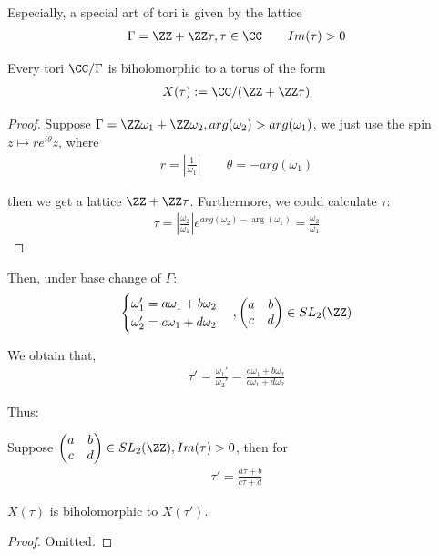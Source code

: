 \documentclass[Total.tex]{subfiles}
\begin{document}
			Especially, a special art of tori is given by the lattice
			\begin{gather*}
				\Gamma=\ZZ+\ZZ\tau,\tau\in \CC\qquad Im(\tau)>0
			\end{gather*}
			
			\begin{lemma}
				Every tori $\CC/\Gamma$ is biholomorphic to a torus of the form
				\begin{gather*}
					X(\tau):=\CC/(\ZZ+\ZZ\tau)
				\end{gather*}
			\end{lemma}
			\begin{proof}
				Suppose $\Gamma=\ZZ\omega_1+\ZZ \omega_2,arg(\omega_2)>arg(\omega_1)$, we just use the spin $z\mapsto re^{i\theta}z$, where
				\begin{gather*}
					r= |\frac{1}{\omega_1}| \qquad \theta=-arg(\omega_1)
				\end{gather*}
				
				then we get a lattice $\ZZ+\ZZ\tau$.  Furthermore, we could calculate $\tau$:
				\begin{gather*}
					\tau= |\frac{\omega_2}{\omega_1}|e^{arg(\omega_2)-\arg(\omega_1)}=\frac{\omega_2}{\omega_1}
				\end{gather*}
			\end{proof}
			
			Then, under base change of $\Gamma$:
			\begin{gather*}\begin{cases}
					\omega_1'=a\omega_1+b\omega_2\\
					\omega_2'=c\omega_1+d\omega_2
				\end{cases},\begin{pmatrix}
					a&b\\
					c&d
				\end{pmatrix}\in SL_2(\ZZ)
			\end{gather*}
			
			We obtain that,
			\begin{gather*}
				\tau'=\frac{\omega_1'}{\omega_2'}=\frac{a\omega_1+b\omega_2}{c\omega_1+d\omega_2}
			\end{gather*}
			
			Thus:
			
			\begin{proposition}
				Suppose $\begin{pmatrix}
					a&b\\
					c&d
				\end{pmatrix}\in SL_2(\ZZ),Im(\tau)>0$, then for
				\begin{gather*}
					\tau'=\frac{a\tau+b}{c\tau+d}
				\end{gather*}
				
				$X(\tau)$ is biholomorphic to $X(\tau')$. 
			\end{proposition}
			\begin{proof}
				Omitted.
			\end{proof}
			
\end{document}
